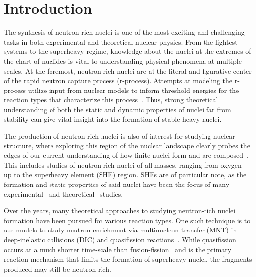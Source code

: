 \documentclass[reprint,aps,prc,twocolumn,superscriptaddress,floatfix,10pt]{revtex4-2}
\begin{document}
\section{Introduction}

The synthesis of neutron-rich nuclei is one of the most exciting and challenging tasks in both experimental and theoretical nuclear physics.
From the lightest systems to the superheavy regime, knowledge about the nuclei at the extremes of the chart of nuclides is vital to understanding physical phenomena at multiple scales.
At the foremost, neutron-rich nuclei are at the literal and figurative center of the rapid neutron capture process (r-process).
Attempts at modeling the r-process utilize input from nuclear models to inform threshold energies for the reaction types that characterize this process~\cite{cowan2019}.
Thus, strong theoretical understanding of both the static and dynamic properties of nuclei far from stability can give vital insight into the formation of stable heavy nuclei.

The production of neutron-rich nuclei is also of interest for studying nuclear structure, where exploring this region of the nuclear landscape clearly probes the edges of our current understanding of how finite nuclei form and are composed~\cite{otsuka2018}. %
This includes studies of neutron-rich nuclei of all masses, ranging from oxygen~\cite{desouza2013} up to the superheavy element (SHE) region.
SHEs are of particular note, as the formation and static properties of said nuclei have been the focus of many experimental~\cite{hofmann2002,munzenberg2015,morita2015,oganessian2015,roberto2015} and theoretical~\cite{bender1999,nazarewicz2002, cwiok2005,pei2009a,stone2019} studies.

Over the years, many theoretical approaches to studying neutron-rich nuclei formation have been pursued for various reaction types.
One such technique is to use models to study neutron enrichment via multinucleon transfer (MNT) in deep-inelastic collisions (DIC) and  quasifission reactions~\cite{adamian2003,zagrebaev2007,umar2008a,golabek2009,aritomo2009,kedziora2010,zhao2016,sekizawa2017a,wu2019}.
While quasifission occurs at a much shorter time-scale than fusion-fission~\cite{toke1985,durietz2011} and is the primary reaction mechanism that limits the formation of superheavy nuclei, the fragments produced may still be neutron-rich.
\end{document}

